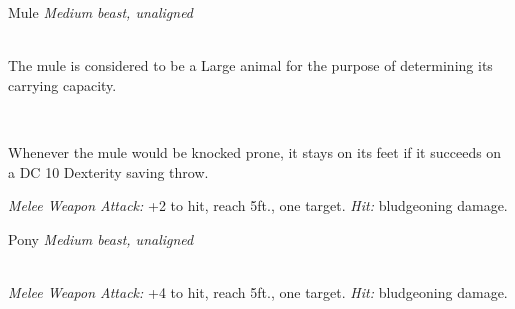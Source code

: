 \documentclass[10pt,twoside,twocolumn,openany]{book}
\begin{document}
\begin{monsterboxnobg}{Mule}
	\textit{Medium beast, unaligned}\\
	\hline
	\basics[
		armorclass	= 10,
		hitpoints 		= \dice{2d8 + 2},
		speed		= {40 ft.}
	]
	\hline
	\stats[
		STR	= \stat{14},
		DEX	= \stat{10},
		CON	= \stat{13},
		INT	= \stat{2},
		WIS	= \stat{10},
		CHA	= \stat{5}
	]
	\hline
	\details[
		skills			= {},
		senses		= {passive Perception 10},
		languages		= {-},
		challenge		= 1/8
	]
	\hline \\[1mm]
	\begin{monsteraction}
		The mule is considered to be a Large animal for the purpose of determining its carrying capacity.
	\end{monsteraction}\\
	\begin{monsteraction}
		Whenever the mule would be knocked prone, it stays on its feet if it succeeds on a DC 10 Dexterity saving throw.
	\end{monsteraction}
	\begin{monsteraction}[Hooves]
		\textit{Melee Weapon Attack:} +2 to hit, reach 5ft., one target. \textit{Hit:}  bludgeoning damage.
	\end{monsteraction}
\end{monsterboxnobg}

\begin{monsterboxnobg}{Pony}
	\textit{Medium beast, unaligned}\\
	\hline
	\basics[
		armorclass	= 10,
		hitpoints 		= \dice{2d8 + 2},
		speed		= {40 ft.}
	]
	\hline
	\stats[
		STR	= \stat{15},
		DEX	= \stat{10},
		CON	= \stat{13},
		INT	= \stat{2},
		WIS	= \stat{11},
		CHA	= \stat{7}
	]
	\hline
	\details[
		skills			= {},
		senses		= {passive Perception 10},
		languages		= {-},
		challenge		= 1/8
	]
	\hline \\[1mm]
	\begin{monsteraction}[Hooves]
		\textit{Melee Weapon Attack:} +4 to hit, reach 5ft., one target. \textit{Hit:}  bludgeoning damage.
	\end{monsteraction}
\end{monsterboxnobg}
\clearpage
\end{document}
